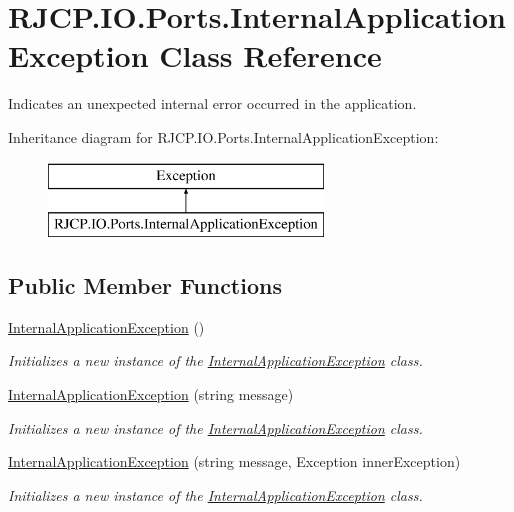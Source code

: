 \hypertarget{class_r_j_c_p_1_1_i_o_1_1_ports_1_1_internal_application_exception}{}\section{R\+J\+C\+P.\+I\+O.\+Ports.\+Internal\+Application\+Exception Class Reference}
\label{class_r_j_c_p_1_1_i_o_1_1_ports_1_1_internal_application_exception}


Indicates an unexpected internal error occurred in the application.  


Inheritance diagram for R\+J\+C\+P.\+I\+O.\+Ports.\+Internal\+Application\+Exception\+:\begin{figure}[H]
\begin{center}
\leavevmode
\includegraphics[height=2.000000cm]{class_r_j_c_p_1_1_i_o_1_1_ports_1_1_internal_application_exception}
\end{center}
\end{figure}
\subsection*{Public Member Functions}
\begin{DoxyCompactItemize}
\item 
\mbox{\hyperlink{class_r_j_c_p_1_1_i_o_1_1_ports_1_1_internal_application_exception_a840da0c3573bf4e658d963d65bfd043d}{Internal\+Application\+Exception}} ()
\begin{DoxyCompactList}\small\item\em Initializes a new instance of the \mbox{\hyperlink{class_r_j_c_p_1_1_i_o_1_1_ports_1_1_internal_application_exception}{Internal\+Application\+Exception}} class. \end{DoxyCompactList}\item 
\mbox{\hyperlink{class_r_j_c_p_1_1_i_o_1_1_ports_1_1_internal_application_exception_a8528706ce032e3d09f8777564cc8d43c}{Internal\+Application\+Exception}} (string message)
\begin{DoxyCompactList}\small\item\em Initializes a new instance of the \mbox{\hyperlink{class_r_j_c_p_1_1_i_o_1_1_ports_1_1_internal_application_exception}{Internal\+Application\+Exception}} class. \end{DoxyCompactList}\item 
\mbox{\hyperlink{class_r_j_c_p_1_1_i_o_1_1_ports_1_1_internal_application_exception_a7118de55cabcf8d3fe296547ca93e528}{Internal\+Application\+Exception}} (string message, Exception inner\+Exception)
\begin{DoxyCompactList}\small\item\em Initializes a new instance of the \mbox{\hyperlink{class_r_j_c_p_1_1_i_o_1_1_ports_1_1_internal_application_exception}{Internal\+Application\+Exception}} class. \end{DoxyCompactList}\end{DoxyCompactItemize}


